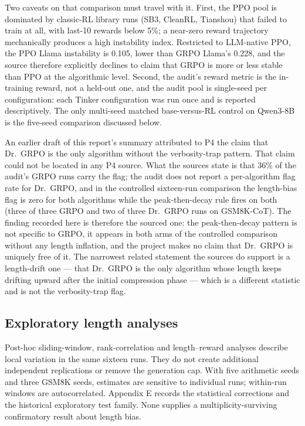 \documentclass[12pt,a4paper]{report}
\begin{document}
Two caveats on that comparison must travel with it. First, the PPO pool
is dominated by classic-RL library runs (SB3, CleanRL, Tianshou) that
failed to train at all, with last-10 rewards below 5\%; a near-zero
reward trajectory mechanically produces a high instability index.
Restricted to LLM-native PPO, the PPO Llama instability is 0.105, lower
than GRPO Llama's 0.228, and the source therefore explicitly declines to
claim that GRPO is more or less stable than PPO at the algorithmic
level. Second, the audit's reward metric is the in-training reward, not
a held-out one, and the audit pool is single-seed per configuration:
each Tinker configuration was run once and is reported descriptively.
The only multi-seed matched base-versus-RL control on Qwen3-8B is the
five-seed comparison discussed below.

An earlier draft of this report's summary attributed to P4 the claim
that Dr.~GRPO is the only algorithm without the verbosity-trap pattern.
That claim could not be located in any P4 source. What the sources state
is that 36\% of the audit's GRPO runs carry the flag; the audit does not
report a per-algorithm flag rate for Dr.~GRPO, and in the controlled
sixteen-run comparison the length-bias flag is zero for both algorithms
while the peak-then-decay rule fires on both (three of three GRPO and
two of three Dr.~GRPO runs on GSM8K-CoT). The finding recorded here is
therefore the sourced one: the peak-then-decay pattern is not specific
to GRPO, it appears in both arms of the controlled comparison without
any length inflation, and the project makes no claim that Dr.~GRPO is
uniquely free of it. The narrowest related statement the sources do
support is a length-drift one --- that Dr.~GRPO is the only algorithm
whose length keeps drifting upward after the initial compression phase
--- which is a different statistic and is not the verbosity-trap flag.

\subsection{Exploratory length
analyses}\label{exploratory-length-analyses}

Post-hoc sliding-window, rank-correlation and length--reward analyses
describe local variation in the same sixteen runs. They do not create
additional independent replications or remove the generation cap. With
five arithmetic seeds and three GSM8K seeds, estimates are sensitive to
individual runs; within-run windows are autocorrelated. Appendix E
records the statistical corrections and the historical exploratory test
family. None supplies a multiplicity-surviving confirmatory result about
length bias.
\end{document}

